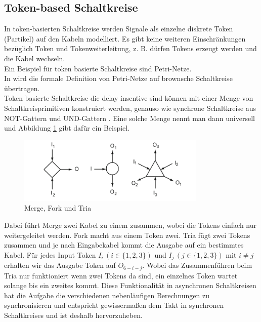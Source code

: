 \documentclass[11pt,a4paper]{article}
\begin{document}

\subsection{Token-based Schaltkreise}
In token-basierten Schaltkreise werden Signale als einzelne diskrete
Token (Partikel) auf den Kabeln modelliert.
%
Es gibt keine weiteren Einschränkungen bezüglich Token und Tokenweiterleitung,
z. B. dürfen Tokens erzeugt werden und die Kabel wechseln. \\
%
Ein Beispiel für token basierte Schaltkreise sind Petri-Netze. \\
%
In \cite{Peper_Fundamentals_2013} wird die formale Definition von Petri-Netze
auf brownsche Schaltkreise übertragen. \\
%
Token basierte Schaltkreise die delay insentive sind können mit 
einer Menge von Schaltkreisprimitiven konstruiert werden, genauso 
wie synchrone Schaltkreise aus NOT-Gattern und UND-Gattern
\cite{Peper_nonPolar_2018}.
%
Eine solche Menge nennt man dann universell und Abbildung \ref{fig:tokenBased}
gibt dafür ein Beispiel.


\begin{figure}[h]
       \centering
       \includegraphics[width=9cm]{bilder/tokenBased.png}
       \caption{Merge, Fork und Tria}
       \label{fig:tokenBased}
\end{figure}    


Dabei führt Merge zwei Kabel zu einem zusammen, wobei die Tokens einfach 
nur weitergeleitet werden.
% 
Fork macht aus einem Token zwei.
%
Tria fügt zwei Tokens zusammen und je nach Eingabekabel kommt
die Ausgabe auf ein bestimmtes Kabel.
%
Für jedes Input Token  $ I_{i} \, (i \in \{1, 2, 3\}) $ und $ I_{j} \, (j \in 
\{1, 2, 3\}) $ mit $ i \ne j $ erhalten wir das Ausgabe Token auf $O_{6-i-j}$.
%
Wobei das Zusammenführen beim Tria nur funktioniert wenn zwei Tokens da sind,
ein einzelnes Token wartet solange bis ein zweites kommt.
%
Diese Funktionalität in asynchronen Schaltkreisen hat die Aufgabe die 
verschiedenen nebenläufigen Berechnungen zu synchronisieren und entspricht
gewissermaßen dem Takt in synchronen Schaltkreises
und ist deshalb hervorzuheben.
%
\end{document}

